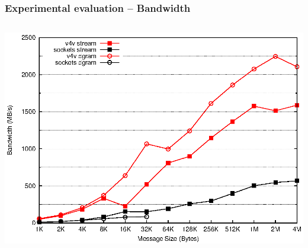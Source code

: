 \documentclass[red,slidestop,notes,compress,mathserif]{beamer}
\begin{document}
\begin{frame}
\frametitle{Experimental evaluation -- Bandwidth}
\begin{columns}
\includegraphics[width=\textwidth]{figures/asdf.eps}
\end{columns}
\end{frame}

\end{document}
